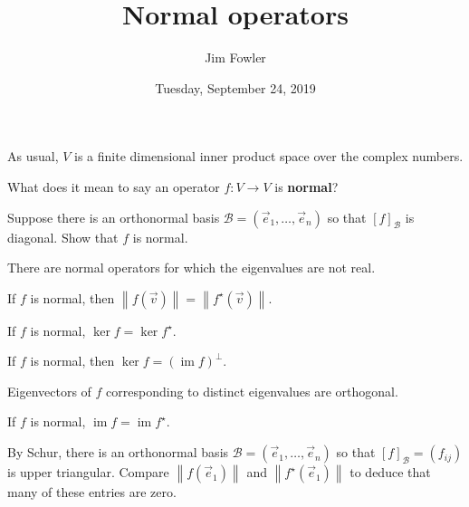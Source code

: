 \documentclass{homework}
\author{Jim Fowler}
\title{Normal operators}
\date{Tuesday, September 24, 2019}
\DeclareMathOperator{\image}{im}
\newcommand{\norm}[1]{\left\|#1\right\|}
\begin{document}
\maketitle

As usual, $V$ is a finite dimensional inner product space over the
complex numbers.

\begin{problem}
  What does it mean to say an operator $f : V \to V$ is \textbf{normal}?
\end{problem}

\vfill

\begin{problem}
  Suppose there is an orthonormal basis $\mathcal{B} = (\vec{e}_1, \ldots, \vec{e}_n)$ so that $[f]_{\mathcal{B}}$ is diagonal.  Show that $f$ is normal.
\end{problem}

\vfill

\begin{problem}
  There are normal operators for which the eigenvalues are not real.
\end{problem}

\vfill

\begin{problem}
  If $f$ is normal, then $\norm{f(\vec{v})} = \norm{f^\star(\vec{v})}$.
\end{problem}

\vfill

\begin{problem}
  If $f$ is normal, $\ker f = \ker f^\star$.
\end{problem}

\vfill

\begin{problem}
  If $f$ is normal, then $\ker f = (\image f)^\perp$.
\end{problem}

\vfill

\begin{problem}
  Eigenvectors of $f$ corresponding to distinct eigenvalues are orthogonal.
\end{problem}

\vfill

\begin{problem}
  If $f$ is normal, $\image f = \image f^\star$.
\end{problem}

\vfill

\begin{problem}
  By Schur, there is an orthonormal basis $\mathcal{B} = (\vec{e}_1, \ldots, \vec{e}_n)$ so that $[f]_{\mathcal{B}} = \left( f_{ij} \right)$ is upper triangular.  Compare $\norm{f(\vec{e}_1)}$ and $\norm{f^\star(\vec{e}_1)}$ to deduce that many of these entries are zero.
\end{problem}
\end{document}
